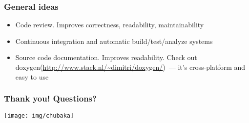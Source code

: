 \documentclass{beamer}
\begin{document}
\begin{frame}
\frametitle{General ideas}
\begin{itemize}
\item Code review. Improves correctness, readability, maintainability
\item Continuous integration and automatic build/test/analyze systems
\item Source code documentation. Improves readability. Check out doxygen(\url{http://www.stack.nl/~dimitri/doxygen/})~--- it's cross-platform and easy to use
\end{itemize}
\end{frame}

\begin{frame}
\frametitle{Thank you! Questions?}
\begin{center}
\texttt{[image: img/chubaka]}
\end{center}
\end{frame}
\end{document}
